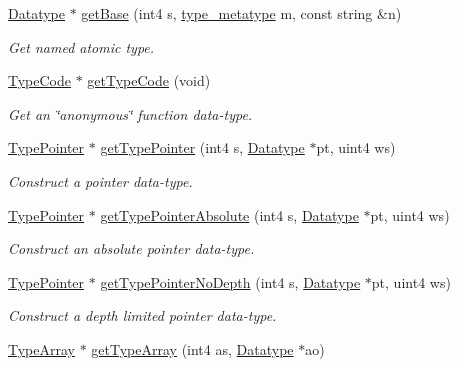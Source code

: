 \begin{DoxyCompactItemize}
\mbox{\hyperlink{class_datatype}{Datatype}} $\ast$ \mbox{\hyperlink{class_type_factory_a2848b5923834b755de0749d9f96880e1}{get\+Base}} (int4 s, \mbox{\hyperlink{type_8hh_aef6429f2523cdf4d415ba04a0209e61f}{type\+\_\+metatype}} m, const string \&n)
\begin{DoxyCompactList}\small\item\em Get named atomic type. \end{DoxyCompactList}\item 
\mbox{\hyperlink{class_type_code}{Type\+Code}} $\ast$ \mbox{\hyperlink{class_type_factory_a47c3d70d9598d2b4ce3770593f6ce97e}{get\+Type\+Code}} (void)
\begin{DoxyCompactList}\small\item\em Get an \char`\"{}anonymous\char`\"{} function data-\/type. \end{DoxyCompactList}\item 
\mbox{\hyperlink{class_type_pointer}{Type\+Pointer}} $\ast$ \mbox{\hyperlink{class_type_factory_a2ff26aa7e6197ffb865907313f752d43}{get\+Type\+Pointer}} (int4 s, \mbox{\hyperlink{class_datatype}{Datatype}} $\ast$pt, uint4 ws)
\begin{DoxyCompactList}\small\item\em Construct a pointer data-\/type. \end{DoxyCompactList}\item 
\mbox{\hyperlink{class_type_pointer}{Type\+Pointer}} $\ast$ \mbox{\hyperlink{class_type_factory_a2295006d8d970d51dc205f5242846d54}{get\+Type\+Pointer\+Absolute}} (int4 s, \mbox{\hyperlink{class_datatype}{Datatype}} $\ast$pt, uint4 ws)
\begin{DoxyCompactList}\small\item\em Construct an absolute pointer data-\/type. \end{DoxyCompactList}\item 
\mbox{\hyperlink{class_type_pointer}{Type\+Pointer}} $\ast$ \mbox{\hyperlink{class_type_factory_a77988d5cf50fc10fe92dec8e265a720f}{get\+Type\+Pointer\+No\+Depth}} (int4 s, \mbox{\hyperlink{class_datatype}{Datatype}} $\ast$pt, uint4 ws)
\begin{DoxyCompactList}\small\item\em Construct a depth limited pointer data-\/type. \end{DoxyCompactList}\item 
\mbox{\hyperlink{class_type_array}{Type\+Array}} $\ast$ \mbox{\hyperlink{class_type_factory_ad1efe412493c66b6072ae0def3b53004}{get\+Type\+Array}} (int4 as, \mbox{\hyperlink{class_datatype}{Datatype}} $\ast$ao)

\end{DoxyCompactItemize}

